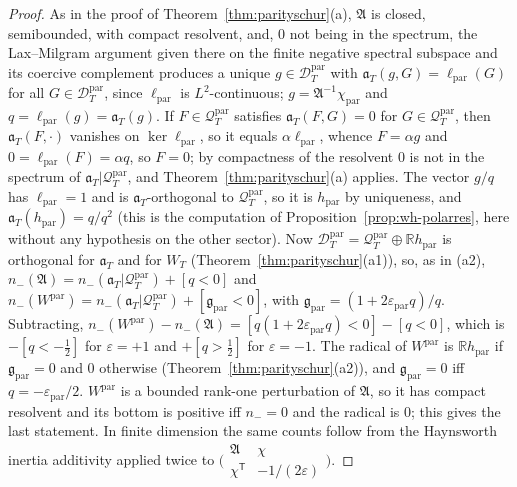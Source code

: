 \documentclass[11pt]{amsart}
\theoremstyle{definition}
\theoremstyle{remark}
\newcommand{\R}{\mathbb R}
\begin{document}
\begin{proof}
As in the proof of Theorem~\ref{thm:parityschur}(a), $\mathfrak A$ is closed, semibounded, with compact resolvent, and,
$0$ not being in the spectrum, the Lax--Milgram argument given there on the finite negative spectral subspace and its
coercive complement produces a unique $g\in\mathcal D^{\mathrm{par}}_T$ with $\mathfrak a_T(g,G)=\ell_{\mathrm{par}}(G)$ for all
$G\in\mathcal D^{\mathrm{par}}_T$, since $\ell_{\mathrm{par}}$ is $L^2$-continuous; $g=\mathfrak A^{-1}\chi_{\mathrm{par}}$ and $q=\ell_{\mathrm{par}}(g)=\mathfrak a_T(g)$.
If $F\in\mathcal Q^{\mathrm{par}}_T$ satisfies $\mathfrak a_T(F,G)=0$ for $G\in\mathcal Q^{\mathrm{par}}_T$, then $\mathfrak a_T(F,\cdot)$ vanishes on
$\ker\ell_{\mathrm{par}}$, so it equals $\alpha\ell_{\mathrm{par}}$, whence $F=\alpha g$ and $0=\ell_{\mathrm{par}}(F)=\alpha q$, so $F=0$; by
compactness of the resolvent $0$ is not in the spectrum of $\mathfrak a_T|\mathcal Q^{\mathrm{par}}_T$, and Theorem~\ref{thm:parityschur}(a)
applies. The vector $g/q$ has $\ell_{\mathrm{par}}=1$ and is $\mathfrak a_T$-orthogonal to $\mathcal Q^{\mathrm{par}}_T$, so it is $h_{\mathrm{par}}$ by
uniqueness, and $\mathfrak a_T(h_{\mathrm{par}})=q/q^2$ (this is the computation of Proposition~\ref{prop:wh-polarres}, here without
any hypothesis on the other sector). Now $\mathcal D^{\mathrm{par}}_T=\mathcal Q^{\mathrm{par}}_T\oplus\R h_{\mathrm{par}}$ is orthogonal for
$\mathfrak a_T$ and for $W_T$ (Theorem~\ref{thm:parityschur}(a1)), so, as in (a2),
$n_-(\mathfrak A)=n_-(\mathfrak a_T|\mathcal Q^{\mathrm{par}}_T)+[q<0]$ and
$n_-(W^{\mathrm{par}})=n_-(\mathfrak a_T|\mathcal Q^{\mathrm{par}}_T)+[\mathfrak g_{\mathrm{par}}<0]$, with
$\mathfrak g_{\mathrm{par}}=(1+2\varepsilon_{\mathrm{par}}q)/q$. Subtracting, $n_-(W^{\mathrm{par}})-n_-(\mathfrak A)=[q(1+2\varepsilon_{\mathrm{par}}q)<0]-[q<0]$, which is
$-[q<-\frac12]$ for $\varepsilon=+1$ and $+[q>\frac12]$ for $\varepsilon=-1$. The radical of $W^{\mathrm{par}}$ is $\R h_{\mathrm{par}}$ if
$\mathfrak g_{\mathrm{par}}=0$ and $0$ otherwise (Theorem~\ref{thm:parityschur}(a2)), and $\mathfrak g_{\mathrm{par}}=0$ iff $q=-\varepsilon_{\mathrm{par}}/2$.
$W^{\mathrm{par}}$ is a bounded rank-one perturbation of $\mathfrak A$, so it has compact resolvent and its bottom is positive iff
$n_-=0$ and the radical is $0$; this gives the last statement. In finite dimension the same counts follow from the
Haynsworth inertia additivity applied twice to $\big(\begin{smallmatrix}\mathfrak A&\chi\\ \chi^{\mathsf T}&-1/(2\varepsilon)\end{smallmatrix}\big)$.
\end{proof}
\end{document}
